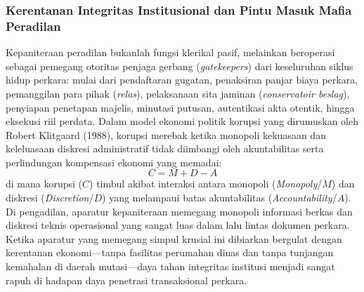 \documentclass[12pt, a4paper]{article}
\begin{document}
\subsubsection{Kerentanan Integritas Institusional dan Pintu Masuk Mafia Peradilan}

Kepaniteraan peradilan bukanlah fungsi klerikal pasif, melainkan beroperasi sebagai pemegang otoritas penjaga gerbang (\textit{gatekeepers}) dari keseluruhan siklus hidup perkara: mulai dari pendaftaran gugatan, penaksiran panjar biaya perkara, pemanggilan para pihak (\textit{relas}), pelaksanaan sita jaminan (\textit{conservatoir beslag}), penyiapan penetapan majelis, minutasi putusan, autentikasi akta otentik, hingga eksekusi riil perdata. Dalam model ekonomi politik korupsi yang dirumuskan oleh Robert Klitgaard (1988), korupsi merebak ketika monopoli kekuasaan dan keleluasaan diskresi administratif tidak diimbangi oleh akuntabilitas serta perlindungan kompensasi ekonomi yang memadai:
\begin{equation}
    C = M + D - A
\end{equation}
di mana korupsi ($C$) timbul akibat interaksi antara monopoli (\textit{Monopoly}/$M$) dan diskresi (\textit{Discretion}/$D$) yang melampaui batas akuntabilitas (\textit{Accountability}/$A$). Di pengadilan, aparatur kepaniteraan memegang monopoli informasi berkas dan diskresi teknis operasional yang sangat luas dalam lalu lintas dokumen perkara. Ketika aparatur yang memegang simpul krusial ini dibiarkan bergulat dengan kerentanan ekonomi---tanpa fasilitas perumahan dinas dan tanpa tunjangan kemahalan di daerah mutasi---daya tahan integritas institusi menjadi sangat rapuh di hadapan daya penetrasi transaksional perkara.
\end{document}
